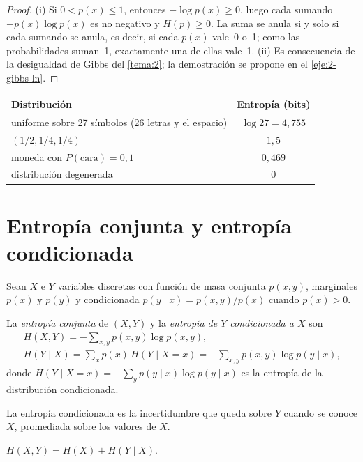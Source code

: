 \begin{proof}
(i) Si $0<p(x)\le 1$, entonces $-\log p(x)\ge 0$, luego cada sumando $-p(x)\log p(x)$ es no negativo y $H(p)\ge 0$. La suma se anula si y solo si cada sumando se anula, es decir, si cada $p(x)$ vale~0 o~1; como las probabilidades suman~1, exactamente una de ellas vale~1. (ii) Es consecuencia de la desigualdad de Gibbs del \cref{tema:2}; la demostración se propone en el \cref{eje:2-gibbs-ln}.
\end{proof}

\begin{center}
\begin{tabular}{@{}lc@{}}
\toprule
Distribución & Entropía (bits) \\
\midrule
uniforme sobre 27 símbolos (26 letras y el espacio) & $\log 27=4{,}755$ \\
$(1/2,1/4,1/4)$ & $1{,}5$ \\
moneda con $P(\text{cara})=0{,}1$ & $0{,}469$ \\
distribución degenerada & $0$ \\
\bottomrule
\end{tabular}
\end{center}

\section{Entropía conjunta y entropía condicionada}

Sean $X$ e $Y$ variables discretas con función de masa conjunta $p(x,y)$, marginales $p(x)$ y $p(y)$ y condicionada $p(y\mid x)=p(x,y)/p(x)$ cuando $p(x)>0$.

\begin{definicion}\label{def:conjunta}
La \emph{entropía conjunta} de $(X,Y)$ y la \emph{entropía de $Y$ condicionada a $X$} son
\begin{gather*}
H(X,Y)=-\sum_{x,y}p(x,y)\log p(x,y),\\
H(Y\mid X)=\sum_{x}p(x)\,H(Y\mid X=x)=-\sum_{x,y}p(x,y)\log p(y\mid x),
\end{gather*}
donde $H(Y\mid X=x)=-\sum_y p(y\mid x)\log p(y\mid x)$ es la entropía de la distribución condicionada.
\end{definicion}

La entropía condicionada es la incertidumbre que queda sobre $Y$ cuando se conoce $X$, promediada sobre los valores de $X$.

\begin{teorema}\label{teo:cadena-entropia}
$H(X,Y)=H(X)+H(Y\mid X)$.
\end{teorema}

